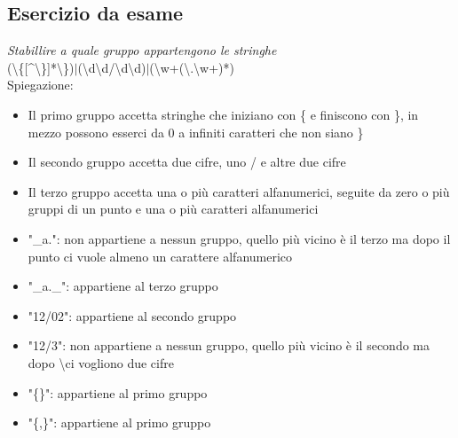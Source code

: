 \documentclass[10pt]{article}
\begin{document}
\subsection{Esercizio da esame}
\textit{Stabillire a quale gruppo appartengono le stringhe}\\
(\textbackslash \{[\textasciicircum\textbackslash\}]*\textbackslash\})$|$(\textbackslash d\textbackslash d/\textbackslash d\textbackslash d)$|$(\textbackslash w+(\textbackslash.\textbackslash w+)*)\\
Spiegazione:
\begin{itemize}
    \item Il primo gruppo accetta stringhe che iniziano con \{ e finiscono con \}, in mezzo possono esserci da 0 a infiniti caratteri che non siano \}
    \item Il secondo gruppo accetta due cifre, uno / e altre due cifre
    \item Il terzo gruppo accetta una o più caratteri alfanumerici, seguite da zero o più gruppi di un punto e una o più caratteri alfanumerici
\end{itemize}
\begin{itemize}
    \item "\_a.": non appartiene a nessun gruppo, quello più vicino è il terzo ma dopo il punto ci vuole almeno un carattere alfanumerico
    \item "\_a.\_": appartiene al terzo gruppo
    \item "12/02": appartiene al secondo gruppo
    \item "12/3": non appartiene a nessun gruppo, quello più vicino è il secondo ma dopo \textbackslash ci vogliono due cifre
    \item "\{\}": appartiene al primo gruppo
    \item "\{,\}": appartiene al primo gruppo
\end{itemize}
\end{document}
